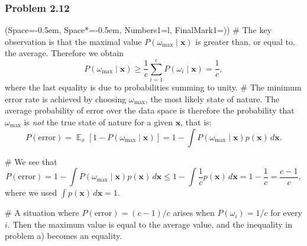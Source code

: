 \documentclass[12pt, a4paper]{article}
\newcommand{\listSpace}{-0.5em}%
\newcommand{\vect}[1]{\bm{#1}}
\DeclareMathOperator{\E}{\mathbb{E}}
\begin{document}
\subsubsection*{Problem 2.12}
\begin{easylist}[enumerate]
\ListProperties(Space=\listSpace, Space*=\listSpace, Numbers1=l, FinalMark1={)})
# The key observation is that the maximal value $P(\omega_{\text{max}}  \mid  \vect{x} )$ is greater than, or equal to, the average. Therefore we obtain
\begin{equation*}
	P(\omega_{\text{max}}  \mid  \vect{x} ) \geq \frac{1}{c} \sum_{i=1}^{c} P(\omega_i  \mid  \vect{x}) = \frac{1}{c},
\end{equation*}
where the last equality is due to probabilities summing to unity.
# The minimum error rate is achieved by choosing $\omega_{\text{max}}$, the most likely state of nature. 
The average probability of error over the data space is therefore the probability that $\omega_{\text{max}}$ is \emph{not} the true state of nature for a given $\vect{x}$, that is:
\begin{equation*}
	P(\text{error}) = \E_x \left[ 1 - P(\omega_{\text{max}}  \mid  \vect{x} ) \right] = 1 - \int P(\omega_{\text{max}}  \mid  \vect{x} ) p(\vect{x}) \, d \vect{x}.
\end{equation*}

# We see that
\begin{equation*}
	P(\text{error}) = 1 - \int P(\omega_{\text{max}}  \mid  \vect{x} ) p(\vect{x}) \, d \vect{x} \leq 1 - \int \frac{1}{c} p(\vect{x}) \, d \vect{x} = 1 - \frac{1}{c} = \frac{c-1}{c},
\end{equation*}
where we used $\int p(\vect{x}) \, d \vect{x} = 1$.


# A situation where $P(\text{error}) = (c-1)/c$ arises when $P(\omega_i) = 1/c$ for every $i$. Then the maximum value is equal to the average value, and the inequality in problem a) becomes an equality.
\end{easylist}
\end{document}
